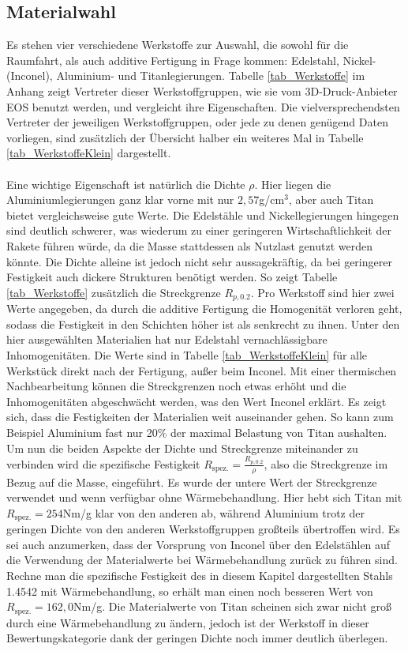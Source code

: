 \subsection{Materialwahl}
Es stehen vier verschiedene Werkstoffe zur Auswahl, die sowohl für die Raumfahrt, als auch additive Fertigung in Frage kommen: Edelstahl, Nickel- (Inconel), Aluminium- und Titanlegierungen. Tabelle \ref{tab_Werkstoffe} im Anhang zeigt Vertreter dieser Werkstoffgruppen, wie sie vom 3D-Druck-Anbieter EOS benutzt werden, und vergleicht ihre Eigenschaften. Die vielversprechendsten Vertreter der jeweiligen Werkstoffgruppen, oder jede zu denen genügend Daten vorliegen, sind zusätzlich der Übersicht halber ein weiteres Mal in Tabelle \ref{tab_WerkstoffeKlein} dargestellt.
\\~\\
Eine wichtige Eigenschaft ist natürlich die Dichte $\rho$. Hier liegen die Aluminiumlegierungen ganz klar vorne mit nur $2,57$g/cm$^3$, aber auch Titan bietet vergleichsweise gute Werte. Die Edelstähle und Nickellegierungen hingegen sind deutlich schwerer, was wiederum zu einer geringeren Wirtschaftlichkeit der Rakete führen würde, da die Masse stattdessen als Nutzlast genutzt werden könnte. Die Dichte alleine ist jedoch nicht sehr aussagekräftig, da bei geringerer Festigkeit auch dickere Strukturen benötigt werden. So zeigt Tabelle \ref{tab_Werkstoffe} zusätzlich die Streckgrenze $R_{p,0.2}$. Pro Werkstoff sind hier zwei Werte angegeben, da durch die additive Fertigung die Homogenität verloren geht, sodass die Festigkeit in den Schichten höher ist als senkrecht zu ihnen. Unter den hier ausgewählten Materialien hat nur Edelstahl vernachlässigbare Inhomogenitäten. Die Werte sind in Tabelle \ref{tab_WerkstoffeKlein} für alle Werkstück direkt nach der Fertigung, außer beim Inconel. Mit einer thermischen Nachbearbeitung können die Streckgrenzen noch etwas erhöht und die Inhomogenitäten abgeschwächt werden, was den Wert Inconel erklärt. Es zeigt sich, dass die Festigkeiten der Materialien weit auseinander gehen. So kann zum Beispiel Aluminium fast nur 20\% der maximal Belastung von Titan aushalten. Um nun die beiden Aspekte der Dichte und Streckgrenze miteinander zu verbinden wird die spezifische Festigkeit $R_\mathrm{spez.}=\frac{R_{p,0.2}}{\rho}$, also die Streckgrenze im Bezug auf die Masse, eingeführt. Es wurde der untere Wert der Streckgrenze verwendet und wenn verfügbar ohne Wärmebehandlung. Hier hebt sich Titan mit $R_\mathrm{spez.}=254$Nm/g klar von den anderen ab, während Aluminium trotz der geringen Dichte von den anderen Werkstoffgruppen großteils übertroffen wird. Es sei auch anzumerken, dass der Vorsprung von Inconel über den Edelstählen auf die Verwendung der Materialwerte bei Wärmebehandlung zurück zu führen sind. Rechne man die spezifische Festigkeit des in diesem Kapitel dargestellten Stahls 1.4542 mit Wärmebehandlung, so erhält man einen noch besseren Wert von $R_\mathrm{spez.} = 162,0$Nm/g. Die Materialwerte von Titan scheinen sich zwar nicht groß durch eine Wärmebehandlung zu ändern, jedoch ist der Werkstoff in dieser Bewertungskategorie dank der geringen Dichte noch immer deutlich überlegen.
